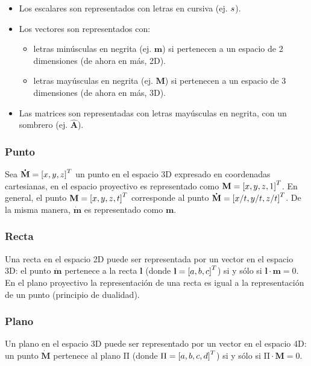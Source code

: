 \documentclass[11pt,a4paper,titlepage]{article}
\newcommand{\Scalar}[1]{\ensuremath{\mathnormal{#1}}}
\newcommand{\Two}[1]{\ensuremath{\mathbf{#1}}}
\newcommand{\Three}[1]{\ensuremath{\mathbf{#1}}}
\newcommand{\Mat}[1]{\ensuremath{\mathbf{\hat{#1}}}}
\newcommand{\TwoCart}[1]{\ensuremath{\mathbf{\dot{#1}}}}
\newcommand{\ThreeCart}[1]{\ensuremath{\mathbf{\dot{#1}}}}
\newcommand{\Vector}[1]{\ensuremath{\left[#1\right]^T}}
\newcommand{\Plane}[1]{\ensuremath{\mathrm{#1}}}
\begin{document}
\begin{itemize}
	\item Los escalares son representados con letras en cursiva (ej. \Scalar{s}).
	\item Los vectores son representados con:
	\begin{itemize}
		\item letras minúsculas en negrita (ej. \Two{m}) si pertenecen a un espacio de 2 dimensiones (de ahora en más, 2D).
		\item letras mayúsculas en negrita (ej. \Three{M}) si pertenecen a un espacio de 3 dimensiones (de ahora en más, 3D).
	\end{itemize}
	\item Las matrices son representadas con letras mayúsculas en negrita, con un sombrero (ej. \Mat{A}).
\end{itemize}

\subsubsection{Punto}

Sea $\ThreeCart{M} = \Vector{\Scalar{x}, \Scalar{y}, \Scalar{z}}$ un punto en el espacio 3D expresado en coordenadas cartesianas, en el espacio proyectivo es representado como $\Three{M} = \Vector{\Scalar{x}, \Scalar{y}, \Scalar{z}, 1}$. En general, el punto $\Three{M} = \Vector{\Scalar{x}, \Scalar{y}, \Scalar{z}, \Scalar{t}}$ corresponde al punto $\ThreeCart{M} = \Vector{\Scalar{x}/\Scalar{t}, \Scalar{y}/\Scalar{t}, \Scalar{z}/\Scalar{t}}$. De la misma manera, \TwoCart{m} es representado como \Two{m}.

\subsubsection{Recta}

Una recta en el espacio 2D puede ser representada por un vector en el espacio 3D: el punto \TwoCart{m} pertenece a la recta \Two{l} (donde $\Two{l} = \Vector{\Scalar{a}, \Scalar{b}, \Scalar{c}}$) si y sólo si $\Two{l} \cdot \Two{m} = 0$. En el plano proyectivo la representación de una recta es igual a la representación de un punto (principio de dualidad).

\subsubsection{Plano}

Un plano en el espacio 3D puede ser representado por un vector en el espacio 4D: un punto \ThreeCart{M} pertenece al plano \Plane{\Pi} (donde $\Plane{\Pi} = \Vector{\Scalar{a}, \Scalar{b}, \Scalar{c}, \Scalar{d}}$) si y sólo si $\Plane{\Pi} \cdot \Three{M} = 0$.
\end{document}
